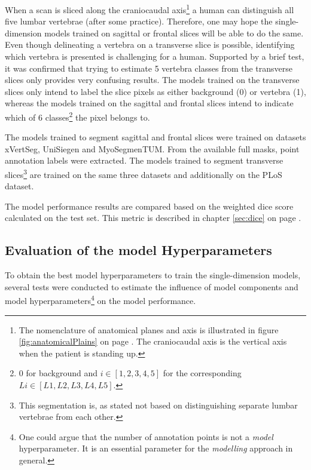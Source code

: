 \par{
    When a scan is sliced along the craniocaudal axis\footnote{
        The nomenclature of anatomical planes and axis is illustrated in figure \ref{fig:anatomicalPlains} on page \pageref{fig:anatomicalPlains}.
        The craniocaudal axis is the vertical axis when the patient is standing up.} 
    a human can distinguish all five lumbar vertebrae (after some practice).
    Therefore, one may hope the single-dimension models trained on sagittal or frontal slices will be able to do the same.
    Even though delineating a vertebra on a transverse slice is possible, identifying which vertebra is presented is challenging for a human.
    Supported by a brief test, it was confirmed that trying to estimate 5 vertebra classes from the transverse slices only provides very confusing results.
    The models trained on the transverse slices only intend to label the slice pixels as either background (0) or vertebra (1), 
    whereas the models trained on the sagittal and frontal slices intend to indicate which of 6 classes\footnote{0 for background and $i\in [1,2,3,4,5]$ for the corresponding $L i \in [L1,L2, L3, L4, L5]$.} the pixel belongs to.
}
\par{
    The models trained to segment sagittal and frontal slices were trained on datasets xVertSeg, UniSiegen and MyoSegmenTUM.
    From the available full masks, point annotation labels were extracted.
    The models trained to segment transverse slices\footnote{This segmentation is, as stated not based on distinguishing separate lumbar vertebrae from each other.} 
    are trained on the same three datasets and additionally on the PLoS dataset.    
}
\par{
    The model performance results are compared based on the weighted dice score calculated on the test set.
    This metric is described in chapter \ref{sec:dice} on page \pageref{sec:dice}.
}
\subsection{Evaluation of the model Hyperparameters}
\par{
    To obtain the best model hyperparameters to train the single-dimension models, several tests were conducted to estimate the influence of model components and model hyperparameters\footnote{
        One could argue that the number of annotation points is not a \textit{model} hyperparameter. It is an essential parameter for the \textit{modelling} approach in general.
    } on the model performance.
}
